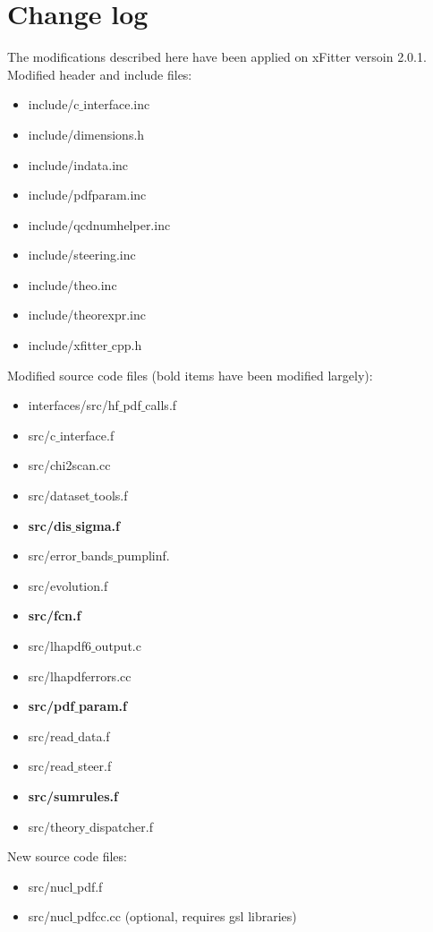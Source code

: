 \documentclass{article}
\begin{document}
\section{Change log}

The modifications described here have been applied on xFitter versoin 2.0.1.\\

Modified header and include files:
\begin{itemize}
\item include/c$\_$interface.inc
\item include/dimensions.h
\item include/indata.inc
\item include/pdfparam.inc
\item include/qcdnumhelper.inc
\item include/steering.inc
\item include/theo.inc
\item include/theorexpr.inc
\item include/xfitter$\_$cpp.h
\end{itemize}

\vskip 0.2in
\noindent Modified source code files (bold items have been modified largely):
\begin{itemize}
\item interfaces/src/hf$\_$pdf$\_$calls.f
\item src/c$\_$interface.f
\item src/chi2scan.cc
\item src/dataset$\_$tools.f
\item \textbf{src/dis$\_$sigma.f}
\item src/error$\_$bands$\_$pumplinf.
\item src/evolution.f
\item \textbf{src/fcn.f}
\item src/lhapdf6$\_$output.c
\item src/lhapdferrors.cc
\item \textbf{src/pdf$\_$param.f}
\item src/read$\_$data.f
\item src/read$\_$steer.f
\item \textbf{src/sumrules.f}
\item src/theory$\_$dispatcher.f
\end{itemize}

\vskip 0.2in
\noindent New source code files:
\begin{itemize}
\item src/nucl$\_$pdf.f
\item src/nucl$\_$pdfcc.cc (optional, requires gsl libraries)
\end{itemize}
\end{document}
